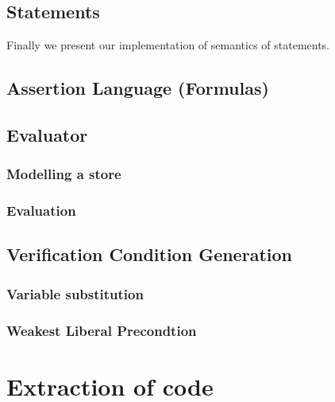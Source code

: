 \subsection{Statements}
Finally we present our implementation of semantics of statements.



\subsection{Assertion Language (Formulas)}\label{sec:iformulas}


\subsection{Evaluator}\label{sec:evaluator}


\subsubsection{Modelling a store}


\subsubsection{Evaluation}


\subsection{Verification Condition Generation}\label{sec:vcg}


\subsubsection{Variable substitution}


\subsubsection{Weakest Liberal Precondtion}\label{sec:impwlp}


\section{Extraction of code}\label{sec:extract}

